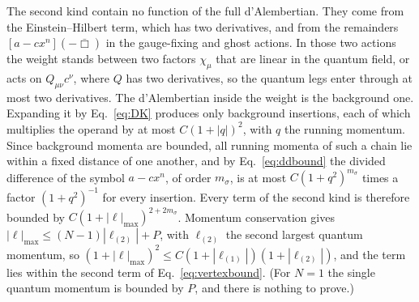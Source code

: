 \documentclass[a4paper,11pt]{article}
\begin{document}
The second kind contain no function of the full d'Alembertian. They come from the Einstein--Hilbert term, which has two derivatives, and from the remainders $[a-cx^n](-\bar\Box)$ in the gauge-fixing and ghost actions. In those two actions the weight stands between two factors $\chi_\mu$ that are linear in the quantum field, or acts on $Q_{\mu\nu}c^\nu$, where $Q$ has two derivatives, so the quantum legs enter through at most two derivatives. The d'Alembertian inside the weight is the background one. Expanding it by Eq.~\eqref{eq:DK} produces only background insertions, each of which multiplies the operand by at most $C(1+|q|)^2$, with $q$ the running momentum. Since background momenta are bounded, all running momenta of such a chain lie within a fixed distance of one another, and by Eq.~\eqref{eq:ddbound} the divided difference of the symbol $a-cx^n$, of order $m_\sigma$, is at most $C(1+q^2)^{m_\sigma}$ times a factor $(1+q^2)^{-1}$ for every insertion. Every term of the second kind is therefore bounded by $C(1+|\ell|_{\max})^{2+2m_\sigma}$. Momentum conservation gives $|\ell|_{\max}\le(N-1)|\ell_{(2)}|+P$, with $\ell_{(2)}$ the second largest quantum momentum, so $(1+|\ell|_{\max})^2\le C(1+|\ell_{(1)}|)(1+|\ell_{(2)}|)$, and the term lies within the second term of Eq.~\eqref{eq:vertexbound}. (For $N=1$ the single quantum momentum is bounded by $P$, and there is nothing to prove.)
\end{document}
